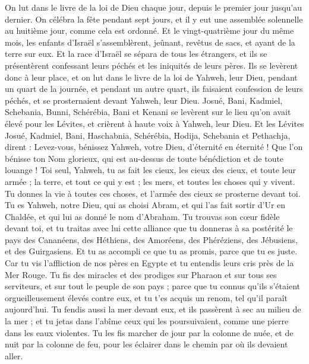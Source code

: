 \begin{multicols}{2}
On lut dans le livre de la loi de Dieu chaque jour, depuis le premier jour jusqu'au dernier. On célébra la fête pendant sept jours, et il y eut une assemblée solennelle au huitième jour, comme cela est ordonné.
\VerseOne{}Et le vingt-quatrième jour du même mois, les enfants d'Israël s'assemblèrent, jeûnant, revêtus de sacs, et ayant de la terre sur eux.
Et la race d'Israël se sépara de tous les étrangers, et ils se présentèrent confessant leurs péchés et les iniquités de leurs pères.
Ils se levèrent donc à leur place, et on lut dans le livre de la loi de Yahweh, leur Dieu, pendant un quart de la journée, et pendant un autre quart, ils faisaient confession de leurs péchés, et se prosternaient devant Yahweh, leur Dieu.
Josué, Bani, Kadmiel, Schebania, Bunni, Schérébia, Bani et Kenani se levèrent sur le lieu qu'on avait élevé pour les Lévites, et crièrent à haute voix à Yahweh, leur Dieu.
Et les Lévites Josué, Kadmiel, Bani, Haschabnia, Schérébia, Hodija, Schebania et Pethachja, dirent : Levez-vous, bénissez Yahweh, votre Dieu, d'éternité en éternité ! Que l'on bénisse ton Nom glorieux, qui est au-dessus de toute bénédiction et de toute louange !
Toi seul, Yahweh, tu as fait les cieux, les cieux des cieux, et toute leur armée ; la terre, et tout ce qui y est ; les mers, et toutes les choses qui y vivent. Tu donnes la vie à toutes ces choses, et l'armée des cieux se prosterne devant toi.
Tu es Yahweh, notre Dieu, qui as choisi Abram, et qui l'as fait sortir d'Ur en Chaldée, et qui lui as donné le nom d'Abraham.
Tu trouvas son cœur fidèle devant toi, et tu traitas avec lui cette alliance que tu donneras à sa postérité le pays des Cananéens, des Héthiens, des Amoréens, des Phéréziens, des Jébusiens, et des Guirgasiens. Et tu as accompli ce que tu as promis, parce que tu es juste.
Car tu vis l'affliction de nos pères en Egypte et tu entendis leurs cris près de la Mer Rouge.
Tu fis des miracles et des prodiges sur Pharaon et sur tous ses serviteurs, et sur tout le peuple de son pays ; parce que tu connus qu'ils s'étaient orgueilleusement élevés contre eux, et tu t'es acquis un renom, tel qu'il paraît aujourd'hui.
Tu fendis aussi la mer devant eux, et ils passèrent à sec au milieu de la mer ; et tu jetas dans l'abîme ceux qui les poursuivaient, comme une pierre dans les eaux violentes.
Tu les fis marcher de jour par la colonne de nuée, et de nuit par la colonne de feu, pour les éclairer dans le chemin par où ils devaient aller.

\end{multicols}
